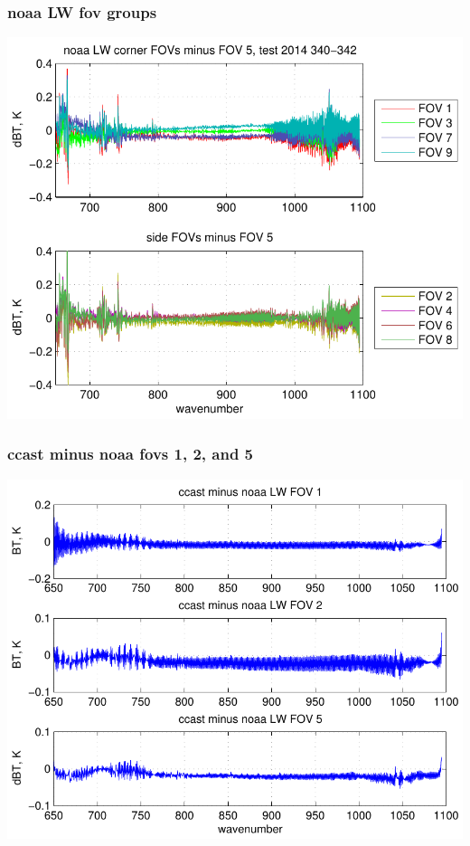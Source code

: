 \documentclass[11pt]{beamer}
\begin{document}
\begin{frame}
\frametitle{noaa LW fov groups}

\begin{center}
  \includegraphics[scale=0.7]{figures/noaa_LW_dif_2014_340-342.pdf}
\end{center}

\end{frame}
\begin{frame}
\frametitle{ccast minus noaa fovs 1, 2, and 5}

\begin{center}
  \includegraphics[scale=0.7]{figures/ccast_noaa_LW_fig_1.pdf}
\end{center}

\end{frame}
\end{document}
